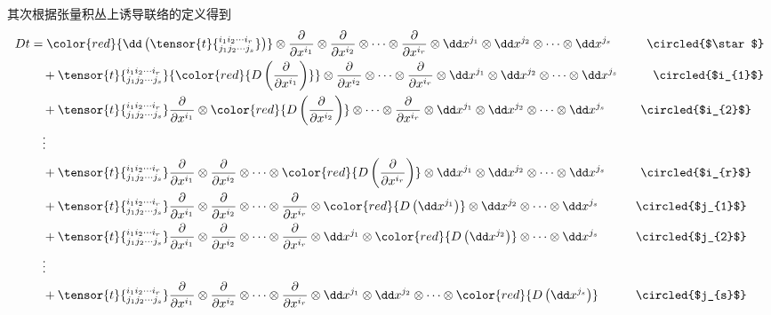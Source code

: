 其次根据张量积丛上诱导联络的定义得到
\[
\begin{split}
Dt&={\color{red}{\dd \left(\tensor{t}{^{i_{1}i_{2}\cdots i_{r}}_{j_{1}j_{2}\cdots j_{s}}}\right)}} \otimes \frac { \partial } { \partial x ^ { i_{1} } }\otimes\frac { \partial } { \partial x ^ { i_{2} } }\otimes\cdots\otimes\frac { \partial } { \partial x ^ { i_{r} } }\otimes\dd x^{j_{1}}\otimes\dd x^{j_{2}}\otimes\cdots\otimes\dd x^{j_{s}} \quad\quad\;\;\;\circled{$\star$}\\
&\quad+\tensor{t}{^{i_{1}i_{2}\cdots i_{r}}_{j_{1}j_{2}\cdots j_{s}}}{\color{red}{D\left(\frac { \partial } { \partial x ^ { i_{1} } }\right)}}\otimes\frac { \partial } { \partial x ^ { i_{2} } }\otimes\cdots\otimes\frac { \partial } { \partial x ^ { i_{r} } }\otimes\dd x^{j_{1}}\otimes\dd x^{j_{2}}\otimes\cdots\otimes\dd x^{j_{s}} \quad\quad\;\;\;\circled{$i_{1}$}\\
&\quad+\tensor{t}{^{i_{1}i_{2}\cdots i_{r}}_{j_{1}j_{2}\cdots j_{s}}}\frac { \partial } { \partial x ^ { i_{1} } }\otimes {\color{red}{D\left(\frac { \partial } { \partial x ^ { i_{2} } }\right)}}\otimes\cdots\otimes\frac { \partial } { \partial x ^ { i_{r} } }\otimes\dd x^{j_{1}}\otimes\dd x^{j_{2}}\otimes\cdots\otimes\dd x^{j_{s}} \quad\quad\;\;\;\circled{$i_{2}$}\\
&\quad\vdots\\
&\quad+\tensor{t}{^{i_{1}i_{2}\cdots i_{r}}_{j_{1}j_{2}\cdots j_{s}}}\frac { \partial } { \partial x ^ { i_{1} } }\otimes\frac { \partial } { \partial x ^ { i_{2} } }\otimes\cdots\otimes {\color{red}{D\left(\frac { \partial } { \partial x ^ { i_{r} } }\right)}}\otimes \dd x^{j_{1}}\otimes\dd x^{j_{2}}\otimes\cdots\otimes \dd x^{j_{s}} \quad\quad\;\;\;\circled{$i_{r}$}\\
&\quad+\tensor{t}{^{i_{1}i_{2}\cdots i_{r}}_{j_{1}j_{2}\cdots j_{s}}}\frac { \partial } { \partial x ^ { i_{1} } }\otimes\frac { \partial } { \partial x ^ { i_{2} } }\otimes\cdots\otimes\frac { \partial } { \partial x ^ { i_{r} } }\otimes {\color{red}{D\left(\dd x^{j_{1}}\right)}}\otimes\dd x^{j_{2}}\otimes\cdots\otimes\dd x^{j_{s}} \quad\quad\quad\circled{$j_{1}$}\\
&\quad+\tensor{t}{^{i_{1}i_{2}\cdots i_{r}}_{j_{1}j_{2}\cdots j_{s}}}\frac { \partial } { \partial x ^ { i_{1} } }\otimes\frac { \partial } { \partial x ^ { i_{2} } }\otimes\cdots\otimes\frac { \partial } { \partial x ^ { i_{r} } }\otimes \dd x^{j_{1}}\otimes {\color{red}{D\left(\dd x^{j_{2}}\right)}}\otimes\cdots\otimes\dd x^{j_{s}} \quad\quad\quad\circled{$j_{2}$}\\
&\quad\vdots\\
&\quad+\tensor{t}{^{i_{1}i_{2}\cdots i_{r}}_{j_{1}j_{2}\cdots j_{s}}}\frac { \partial } { \partial x ^ { i_{1} } }\otimes\frac { \partial } { \partial x ^ { i_{2} } }\otimes\cdots\otimes\frac { \partial } { \partial x ^ { i_{r} } }\otimes \dd x^{j_{1}}\otimes\dd x^{j_{2}}\otimes\cdots\otimes {\color{red}{D\left(\dd x^{j_{s}} \right)}}\quad\quad\quad\circled{$j_{s}$}\\
\end{split}
\]

